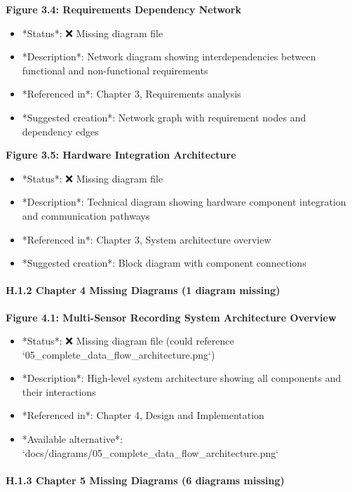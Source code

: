 \documentclass[12pt,a4paper]{article}
\begin{document}
{{\begin{itemize}
\end{itemize}
\textbf{Figure 3.4: Requirements Dependency Network}

\begin{itemize}
\item *Status*: ❌ Missing diagram file
\item *Description*: Network diagram showing interdependencies between functional and non-functional requirements
\item *Referenced in*: Chapter 3, Requirements analysis
\item *Suggested creation*: Network graph with requirement nodes and dependency edges

\end{itemize}
\textbf{Figure 3.5: Hardware Integration Architecture}

\begin{itemize}
\item *Status*: ❌ Missing diagram file
\item *Description*: Technical diagram showing hardware component integration and communication pathways
\item *Referenced in*: Chapter 3, System architecture overview
\item *Suggested creation*: Block diagram with component connections

\end{itemize}
\paragraph{H.1.2 Chapter 4 Missing Diagrams (1 diagram missing)}

\textbf{Figure 4.1: Multi-Sensor Recording System Architecture Overview}

\begin{itemize}
\item *Status*: ❌ Missing diagram file (could reference `05_complete_data_flow_architecture.png`)
\item *Description*: High-level system architecture showing all components and their interactions
\item *Referenced in*: Chapter 4, Design and Implementation
\item *Available alternative*: `docs/diagrams/05_complete_data_flow_architecture.png`

\end{itemize}
\paragraph{H.1.3 Chapter 5 Missing Diagrams (6 diagrams missing)}

}}
\end{document}
